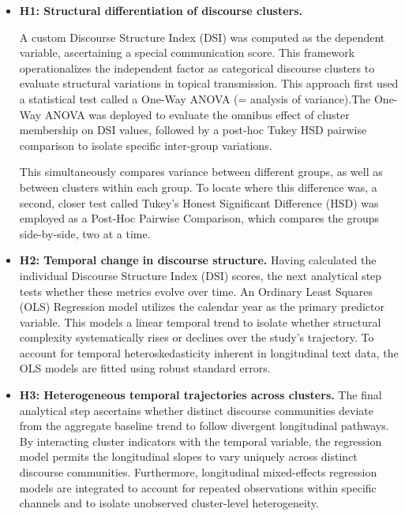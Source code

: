 \documentclass[11pt]{article}
\begin{document}
\begin{itemize}


\item \textbf{H1: Structural differentiation of discourse clusters.}

A custom Discourse Structure Index (DSI) was computed as the dependent variable, ascertaining a special communication score. This framework operationalizes the independent factor as categorical discourse clusters to evaluate structural variations in topical transmission. This approach first used a statistical test called a One-Way ANOVA (= analysis of variance).The One-Way ANOVA was deployed to evaluate the omnibus effect of cluster membership on DSI values, followed by a post-hoc Tukey HSD pairwise comparison to isolate specific inter-group variations.

 This simultaneously compares variance between different groups, as well as between clusters within each group. To locate where this difference was, a second, closer test called Tukey’s Honest Significant Difference (HSD) was employed as a Post-Hoc Pairwise Comparison, which compares the groups side-by-side, two at a time. 

\item \textbf{H2: Temporal change in discourse structure.}
Having calculated the individual Discourse Structure Index (DSI) scores, the next analytical step tests whether these metrics evolve over time. An Ordinary Least Squares (OLS) Regression model utilizes the calendar year as the primary predictor variable. This models a linear temporal trend to isolate whether structural complexity systematically rises or declines over the study's trajectory. To account for temporal heteroskedasticity inherent in longitudinal text data, the OLS models are fitted using robust standard errors.

\item \textbf{H3: Heterogeneous temporal trajectories across clusters.}
The final analytical step ascertains whether distinct discourse communities deviate from the aggregate baseline trend to follow divergent longitudinal pathways. By interacting cluster indicators with the temporal variable, the regression model permits the longitudinal slopes to vary uniquely across distinct discourse communities. Furthermore, longitudinal mixed-effects regression models are integrated to account for repeated observations within specific channels and to isolate unobserved cluster-level heterogeneity.


\end{itemize}
\end{document}
